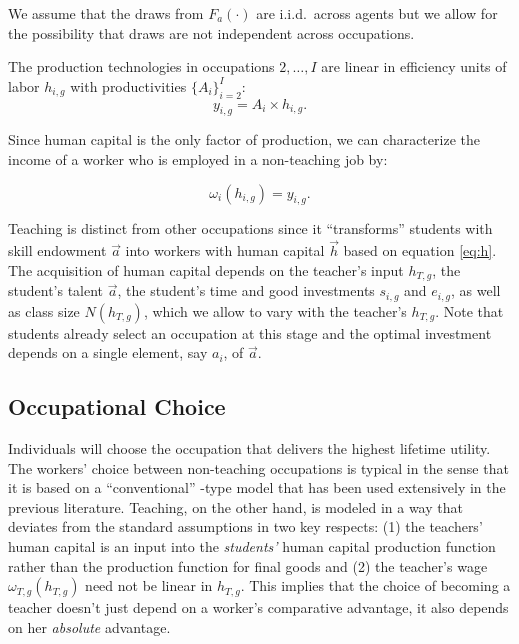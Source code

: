 \documentclass[onehalfspacing,11pt]{article}
\begin{document}
	
	We assume that the draws from $F_a \left( \cdot \right)$ are i.i.d.~across agents but we allow for the possibility that draws are not independent across occupations.
	
	The production technologies in occupations $2,\ldots,I$ are linear in efficiency units of labor $h_{i,g}$ with productivities $\{A_i\}_{i=2}^I$:
	\begin{equation}
		\label{ }
		y_{i,g} = A_i \times h_{i,g}.
	\end{equation}
	
	Since human capital is the only factor of production, we can characterize the income of a worker who is employed in a non-teaching job by:
	
	\begin{equation}
		\label{ }
		\omega_{i} \left( h_{i,g} \right) = y_{i,g}.
	\end{equation}
	
	Teaching is distinct from other occupations since it ``transforms'' students with skill endowment $\vec{a}$ into workers with human capital $\vec{h}$ based on equation \eqref{eq:h}. The acquisition of human capital depends on the teacher's input $h_{T,g}$, the student's talent $\vec{a}$, the student's time and good investments $s_{i,g}$ and $e_{i,g}$, as well as class size $N(h_{T,g})$, which we allow to vary with the teacher's $h_{T,g}$. Note that students already select an occupation at this stage and the optimal investment depends on a single element, say $a_i$, of $\vec{a}$. 
	
	\subsection{Occupational Choice}
	
	Individuals will choose the occupation that delivers the highest lifetime utility. The workers' choice between non-teaching occupations is typical in the sense that it is based on a ``conventional'' \cite{Roy:1951}-type model that has been used extensively in the previous literature. Teaching, on the other hand, is modeled in a way that deviates from the standard assumptions in two key respects: (1) the teachers' human capital is an input into the {\it students'} human capital production function rather than the production function for final goods and (2) the teacher's wage $\omega_{T,g}\left( h_{T,g} \right)$ need not be linear in $h_{T,g}$. This implies that the choice of becoming a teacher doesn't just depend on a worker's comparative advantage, it also depends on her {\it absolute} advantage.
	
\end{document}
